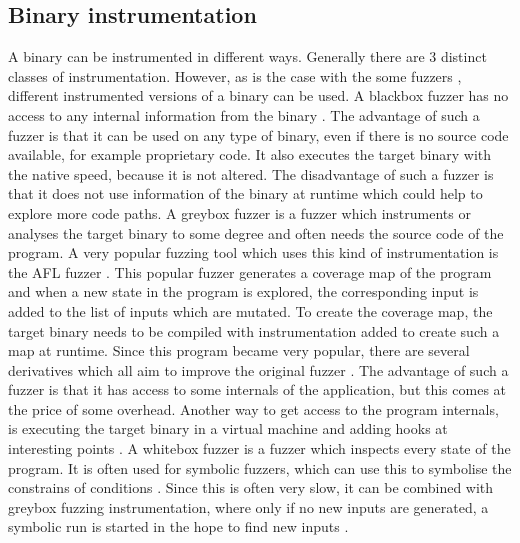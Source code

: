 \subsection{Binary instrumentation}\label{subsec:binary-instrumentation}
A binary can be instrumented in different ways. Generally there are 3 distinct classes of instrumentation. However, as is the case with the some fuzzers \cite{chen2018angora}, different instrumented versions of a binary can be used. A blackbox fuzzer has no access to any internal information from the binary \cite{eddington2011peach,helin2018radamsa}. The advantage of such a fuzzer is that it can be used on any type of binary, even if there is no source code available, for example proprietary code. It also executes the target binary with the native speed, because it is not altered.
The disadvantage of such a fuzzer is that it does not use information of the binary at runtime which could help to explore more code paths.
A greybox fuzzer is a fuzzer which instruments or analyses the target binary to some degree \cite{hongfuzz} and often needs the source code of the program. A very popular fuzzing tool which uses this kind of instrumentation is the AFL fuzzer \cite{aflfuzzer}. This popular fuzzer generates a coverage map of the program and when a new state in the program is explored, the corresponding input is added to the list of inputs which are mutated. To create the coverage map, the target binary needs to be compiled with instrumentation added to create such a map at runtime. Since this program became very popular, there are several derivatives which all aim to improve the original fuzzer \cite{bohme2017directed,bohme2017coverage,lemieux2018fairfuzz}. The advantage of such a fuzzer is that it has access to some internals of the application, but this comes at the price of some overhead. Another way to get access to the program internals, is executing the target binary in a virtual machine and adding hooks at interesting points \cite{schumilo2017kafl, aschermann2019redqueen}.
A whitebox fuzzer is a fuzzer which inspects every state of the program. It is often used for symbolic fuzzers, which can use this to symbolise the constrains of conditions \cite{han2019synfuzz,stephens2016driller, liang2019deepfuzzer}. Since this is often very slow, it can be combined with greybox fuzzing instrumentation, where only if no new inputs are generated, a symbolic run is started in the hope to find new inputs \cite{stephens2016driller}.


